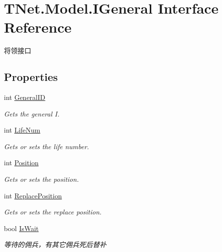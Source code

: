 \hypertarget{interface_t_net_1_1_model_1_1_i_general}{}\section{T\+Net.\+Model.\+I\+General Interface Reference}
\label{interface_t_net_1_1_model_1_1_i_general}


将领接口  


\subsection*{Properties}
\begin{DoxyCompactItemize}
\item 
int \mbox{\hyperlink{interface_t_net_1_1_model_1_1_i_general_a21f54387092ead863cecfc6c2114cf0d}{General\+ID}}
\begin{DoxyCompactList}\small\item\em Gets the general I. \end{DoxyCompactList}\item 
int \mbox{\hyperlink{interface_t_net_1_1_model_1_1_i_general_abaedd0abfd23111fc0c1de3044b74a50}{Life\+Num}}
\begin{DoxyCompactList}\small\item\em Gets or sets the life number. \end{DoxyCompactList}\item 
int \mbox{\hyperlink{interface_t_net_1_1_model_1_1_i_general_a8df70d044c0bd095103101acbcfbe662}{Position}}
\begin{DoxyCompactList}\small\item\em Gets or sets the position. \end{DoxyCompactList}\item 
int \mbox{\hyperlink{interface_t_net_1_1_model_1_1_i_general_a4739d5eb5c5da0ecbed0365662ea2f5e}{Replace\+Position}}
\begin{DoxyCompactList}\small\item\em Gets or sets the replace position. \end{DoxyCompactList}\item 
bool \mbox{\hyperlink{interface_t_net_1_1_model_1_1_i_general_a5c99137fe235493508e4dc143c3b6f60}{Is\+Wait}}
\begin{DoxyCompactList}\small\item\em 等待的佣兵，有其它佣兵死后替补 \end{DoxyCompactList}\end{DoxyCompactItemize}


